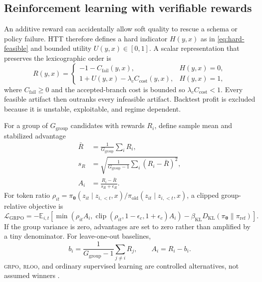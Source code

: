 \documentclass[10pt,letterpaper]{article}
\newcommand{\abbr}[1]{\textsc{\MakeLowercase{#1}}}
\newcommand{\E}{\mathbb{E}}
\newcommand{\1}{\mathbb{1}}
\newcommand{\vect}[1]{\bm{#1}}
\newcommand{\clip}{\operatorname{clip}}
\newcommand{\KL}{D_{\mathrm{KL}}}
\begin{document}
\subsection{Reinforcement learning with verifiable rewards}

An additive reward can accidentally allow soft quality to rescue a schema or policy failure.  HTT
therefore defines a hard indicator $H(y,x)$ as in \cref{eq:hard-feasible} and bounded utility
$U(y,x)\in[0,1]$.  A scalar representation that preserves the lexicographic order is
\begin{equation}
  R(y,x)=
  \begin{cases}
    -1-C_{\mathrm{fail}}(y,x), & H(y,x)=0,\\
    1+U(y,x)-\lambda_c C_{\mathrm{cost}}(y,x), & H(y,x)=1,
  \end{cases}
  \label{eq:hard-reward}
\end{equation}
where $C_{\mathrm{fail}}\ge0$ and the accepted-branch cost is bounded so
$\lambda_cC_{\mathrm{cost}}<1$.  Every feasible artifact then outranks every infeasible artifact.
Backtest profit is excluded because it is unstable, exploitable, and regime dependent.

For a group of $G_{\mathrm{group}}$ candidates with rewards $R_i$, define sample mean and stabilized
advantage
\begin{align}
  \bar R&=\frac{1}{G_{\mathrm{group}}}\sum_iR_i,\\
  s_R&=\sqrt{\frac{1}{G_{\mathrm{group}}-1}\sum_i(R_i-\bar R)^2},\\
  A_i&=\frac{R_i-\bar R}{s_R+\epsilon_R}.
  \label{eq:group-advantage}
\end{align}
For token ratio
$\rho_{it}=\pi_{\vect\theta}(z_{it}\mid z_{i,<t},x)/
\pi_{\mathrm{old}}(z_{it}\mid z_{i,<t},x)$, a clipped group-relative objective is
\begin{equation}
  \mathcal L_{\mathrm{GRPO}}
  =-\E_{i,t}\left[
     \min\left(\rho_{it}A_i,
       \clip(\rho_{it},1-\epsilon_c,1+\epsilon_c)A_i\right)
   -\beta_{\mathrm{KL}}\KL(\pi_{\vect\theta}\|\pi_{\mathrm{ref}})
  \right].
  \label{eq:grpo}
\end{equation}
If the group variance is zero, advantages are set to zero rather than amplified by a tiny denominator.
For leave-one-out baselines,
\begin{equation}
  b_i=\frac{1}{G_{\mathrm{group}}-1}\sum_{j\ne i}R_j,
  \qquad A_i=R_i-b_i.
  \label{eq:rloo}
\end{equation}
\abbr{GRPO}, \abbr{RLOO}, and ordinary supervised learning are controlled alternatives, not assumed
winners \cite{ahmadian2024rloo,shao2024deepseekmath}.
\end{document}
